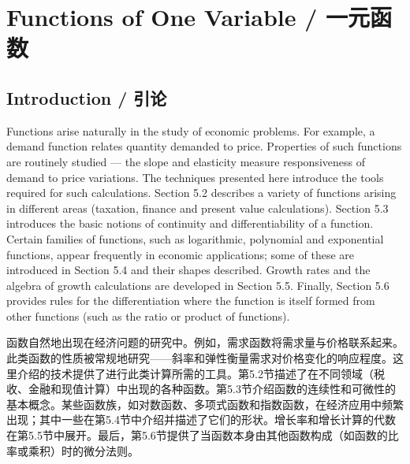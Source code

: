 
\chapter{Functions of One Variable / 一元函数}

\section{Introduction / 引论}

\begin{original}
Functions arise naturally in the study of economic problems. For example, a demand function relates quantity demanded to price. Properties of such functions are routinely studied --- the slope and elasticity measure responsiveness of demand to price variations. The techniques presented here introduce the tools required for such calculations. Section 5.2 describes a variety of functions arising in different areas (taxation, finance and present value calculations). Section 5.3 introduces the basic notions of continuity and differentiability of a function. Certain families of functions, such as logarithmic, polynomial and exponential functions, appear frequently in economic applications; some of these are introduced in Section 5.4 and their shapes described. Growth rates and the algebra of growth calculations are developed in Section 5.5. Finally, Section 5.6 provides rules for the differentiation where the function is itself formed from other functions (such as the ratio or product of functions).
\end{original}
\begin{translation}
函数自然地出现在经济问题的研究中。例如，需求函数将需求量与价格联系起来。此类函数的性质被常规地研究——斜率和弹性衡量需求对价格变化的响应程度。这里介绍的技术提供了进行此类计算所需的工具。第5.2节描述了在不同领域（税收、金融和现值计算）中出现的各种函数。第5.3节介绍函数的连续性和可微性的基本概念。某些函数族，如对数函数、多项式函数和指数函数，在经济应用中频繁出现；其中一些在第5.4节中介绍并描述了它们的形状。增长率和增长计算的代数在第5.5节中展开。最后，第5.6节提供了当函数本身由其他函数构成（如函数的比率或乘积）时的微分法则。
\end{translation}


